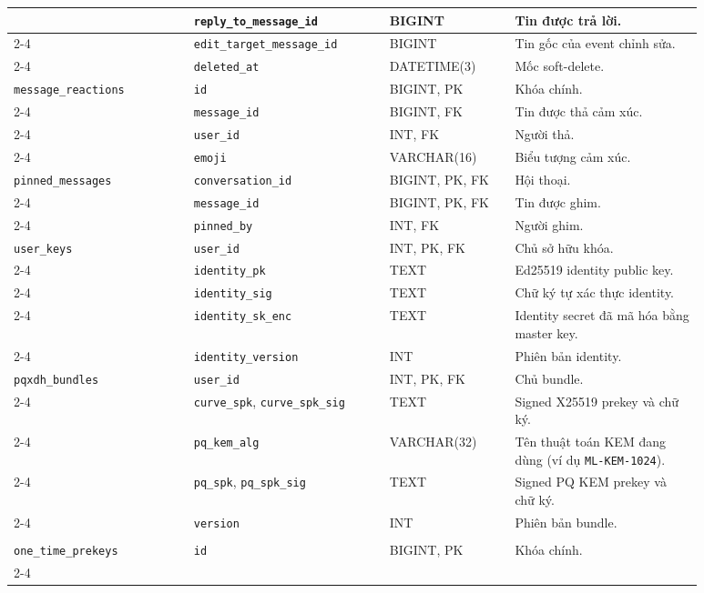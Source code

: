{\begin{longtable}{|p{0.23\linewidth}|p{0.25\linewidth}|p{0.16\linewidth}|p{0.24\linewidth}|}
 & \texttt{reply\_to\_message\_id} & BIGINT & Tin được trả lời. \\ \cline{2-4}
 & \texttt{edit\_target\_message\_id} & BIGINT & Tin gốc của event chỉnh sửa. \\ \cline{2-4}
 & \texttt{deleted\_at} & DATETIME(3) & Mốc soft-delete. \\ \hline
\texttt{message\_reactions} & \texttt{id} & BIGINT, PK & Khóa chính. \\ \cline{2-4}
 & \texttt{message\_id} & BIGINT, FK & Tin được thả cảm xúc. \\ \cline{2-4}
 & \texttt{user\_id} & INT, FK & Người thả. \\ \cline{2-4}
 & \texttt{emoji} & VARCHAR(16) & Biểu tượng cảm xúc. \\ \hline
\texttt{pinned\_messages} & \texttt{conversation\_id} & BIGINT, PK, FK & Hội thoại. \\ \cline{2-4}
 & \texttt{message\_id} & BIGINT, PK, FK & Tin được ghim. \\ \cline{2-4}
 & \texttt{pinned\_by} & INT, FK & Người ghim. \\ \hline
\texttt{user\_keys} & \texttt{user\_id} & INT, PK, FK & Chủ sở hữu khóa. \\ \cline{2-4}
 & \texttt{identity\_pk} & TEXT & Ed25519 identity public key. \\ \cline{2-4}
 & \texttt{identity\_sig} & TEXT & Chữ ký tự xác thực identity. \\ \cline{2-4}
 & \texttt{identity\_sk\_enc} & TEXT & Identity secret đã mã hóa bằng master key. \\ \cline{2-4}
 & \texttt{identity\_version} & INT & Phiên bản identity. \\ \hline
\texttt{pqxdh\_bundles} & \texttt{user\_id} & INT, PK, FK & Chủ bundle. \\ \cline{2-4}
 & \texttt{curve\_spk}, \texttt{curve\_spk\_sig} & TEXT & Signed X25519 prekey và chữ ký. \\ \cline{2-4}
 & \texttt{pq\_kem\_alg} & VARCHAR(32) & Tên thuật toán KEM đang dùng (ví dụ \texttt{ML-KEM-1024}). \\ \cline{2-4}
 & \texttt{pq\_spk}, \texttt{pq\_spk\_sig} & TEXT & Signed PQ KEM prekey và chữ ký. \\ \cline{2-4}
 & \texttt{version} & INT & Phiên bản bundle. \\ \hline
\makecell[tl]{\texttt{pqxdh\_curve\_}\\\texttt{one\_time\_prekeys}} & \texttt{id} & BIGINT, PK & Khóa chính. \\ \cline{2-4}

\end{longtable}}
